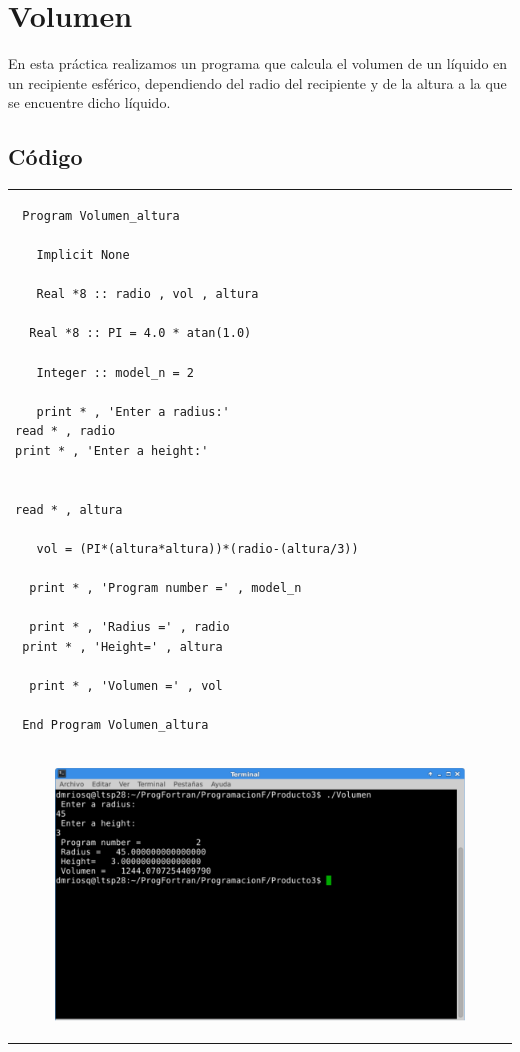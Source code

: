 \documentclass[10pt]{article}
\begin{document}
\section{Volumen}
En esta práctica realizamos un programa que calcula el volumen de un líquido en un recipiente esférico, dependiendo del radio del recipiente y de la altura a la que se encuentre dicho líquido.


\subsection{Código}
\begin{tabular}{l}
\begin{verbatim}  
 Program Volumen_altura 

   Implicit None 

   Real *8 :: radio , vol , altura 

  Real *8 :: PI = 4.0 * atan(1.0) 

   Integer :: model_n = 2 

   print * , 'Enter a radius:'
read * , radio 
print * , 'Enter a height:'

    
read * , altura

   vol = (PI*(altura*altura))*(radio-(altura/3))

  print * , 'Program number =' , model_n 

  print * , 'Radius =' , radio 
 print * , 'Height=' , altura
   
  print * , 'Volumen =' , vol 

 End Program Volumen_altura
\end{verbatim} \\
\begin{figure}
  \centering
    \includegraphics[scale=0.4]{V}
\end{figure}
\end{tabular}
\end{document}
